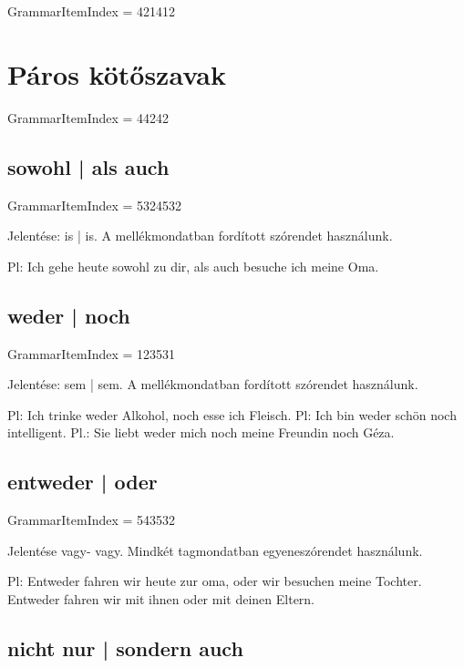 \documentclass{article}
\newenvironment{desc}{\verbatim}{\endverbatim}
\begin{document}
GrammarItemIndex = 421412

\section{Páros kötőszavak}

GrammarItemIndex = 44242

\subsection{sowohl | als auch}

GrammarItemIndex = 5324532

\begin{desc}
Jelentése: is | is. A mellékmondatban fordított szórendet használunk.

Pl: Ich gehe heute sowohl zu dir, als auch besuche ich meine Oma. 
\end{desc}

\subsection{weder | noch}

GrammarItemIndex = 123531

\begin{desc}
Jelentése: sem | sem. A mellékmondatban fordított szórendet használunk.

Pl: Ich trinke weder Alkohol, noch esse ich Fleisch.
Pl: Ich bin weder schön noch intelligent.
Pl.: Sie liebt weder mich noch meine Freundin noch Géza.
\end{desc}

\subsection{entweder | oder}

GrammarItemIndex = 543532

\begin{desc}
Jelentése vagy- vagy. Mindkét tagmondatban egyeneszórendet használunk.

Pl: Entweder fahren wir heute zur oma, oder wir besuchen meine Tochter.
Entweder fahren wir mit ihnen oder mit deinen Eltern.
\end{desc}

\subsection{nicht nur | sondern auch}
\end{document}
